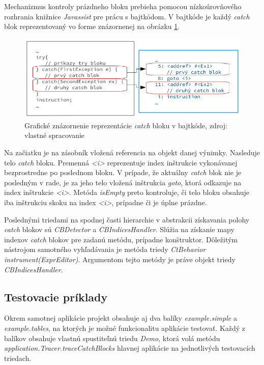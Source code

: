 \documentclass[11pt,final,oneside]{fithesis}
\begin{document}
Mechanizmus kontroly prázdneho bloku prebieha pomocou nízkoúrovňového 
rozhrania knižnice \textit{Javassist} pre prácu s bajtkódom. V bajtkóde je 
každý \textit{catch} blok reprezentovaný vo forme znázornenej na obrázku 
\ref{fig:catch}.

\begin{figure}[h]
  \centering
   \includegraphics[width=\textwidth]{catch.png}
  \caption{Grafické znázornenie reprezentácie \textit{catch} bloku v bajtkóde,
  zdroj: vlastné spracovanie}
  \label{fig:catch}
\end{figure}

Na začiatku je na zásobník vložená referencia na objekt danej výnimky. 
Nasleduje telo \textit{catch} bloku. Premenná \textit{<i>} reprezentuje index 
inštrukcie vykonávanej bezprostredne po poslednom bloku. 
V prípade, že aktuálny \textit{catch} blok nie je posledným v 
rade, je za jeho telo vložená inštrukcia \textit{goto}, ktorá odkazuje na 
index inštrukcie \textit{<i>}. Metóda \textit{isEmpty} preto kontroluje, či 
telo bloku obsahuje iba inštrukciu skoku na index \textit{<i>}, 
prípadne či je úplne prázdne. 

Poslednými triedami na spodnej časti hierarchie v abstrakcii získavania polohy 
\textit{catch} blokov sú \textit{CBDetector} a \textit{CBIndicesHandler}. 
Slúžia na získanie mapy indexov \textit{catch} blokov pre zadanú metódu, 
prípadne konštruktor. Dôležitým nástrojom samotného vyhľadávania je metóda 
triedy
\textit{CtBehavior instrument(ExprEditor)}. Argumentom tejto metódy je práve 
objekt triedy \textit{CBIndicesHandler}.

\subsection{Testovacie príklady}
Okrem samotnej aplikácie projekt obsahuje aj dva balíky
\textit{example.simple} a \textit{example.tables}, na ktorých je možné 
funkcionalitu aplikácie testovať. Každý z balíkov obsahuje vlastnú spustiteľnú 
triedu \textit{Demo}, ktorá volá metódu 
\textit{application.Tracer.traceCatchBlocks} hlavnej aplikácie na jednotlivých 
testovacích triedach. 
\end{document}
